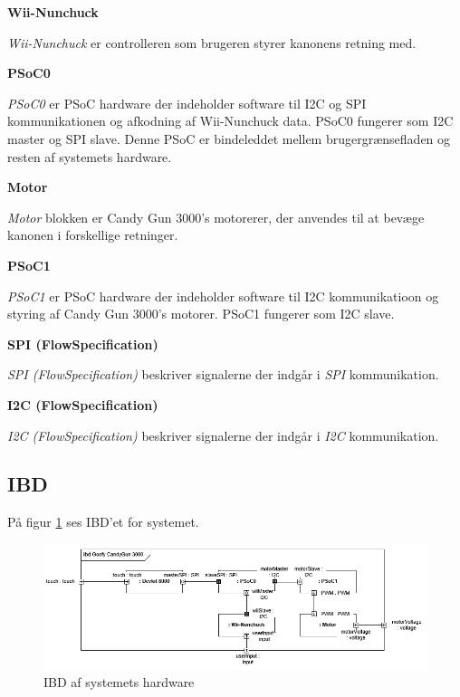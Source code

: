 \noindent \textbf{Wii-Nunchuck} \par
\noindent \textit{Wii-Nunchuck} er controlleren som brugeren styrer kanonens retning med.

\noindent \textbf{PSoC0} \par
\noindent \textit{PSoC0} er PSoC hardware der indeholder software til I2C og SPI kommunikationen og afkodning af Wii-Nunchuck data. PSoC0 fungerer som I2C master og SPI slave. Denne PSoC er bindeleddet mellem brugergrænsefladen og resten af systemets hardware.

\noindent \textbf{Motor} \par
\noindent \textit{Motor} blokken er Candy Gun 3000's motorerer, der anvendes til at bevæge kanonen i forskellige retninger.

\noindent \textbf{PSoC1} \par
\noindent \textit{PSoC1} er PSoC hardware der indeholder software til I2C kommunikatioon og styring af Candy Gun 3000's motorer. PSoC1 fungerer som I2C slave.


\noindent \textbf{SPI (FlowSpecification)} \par
\noindent \textit{SPI (FlowSpecification)} beskriver signalerne der indgår i \textit{SPI} kommunikation.

\noindent \textbf{I2C (FlowSpecification)} \par
\noindent \textit{I2C (FlowSpecification)} beskriver signalerne der indgår i \textit{I2C} kommunikation.

\subsection{IBD}
\label{afsnit:IBD}

På figur \ref{figure:ibdDiagram} ses IBD'et for systemet.

\begin{figure}[H]
	\centering
	\includegraphics[width=\textwidth]{SystemArkitektur/images/GoofyCandyIBDImageRev2.PNG}
	\caption{IBD af systemets hardware}
	\label{figure:ibdDiagram}
\end{figure}

